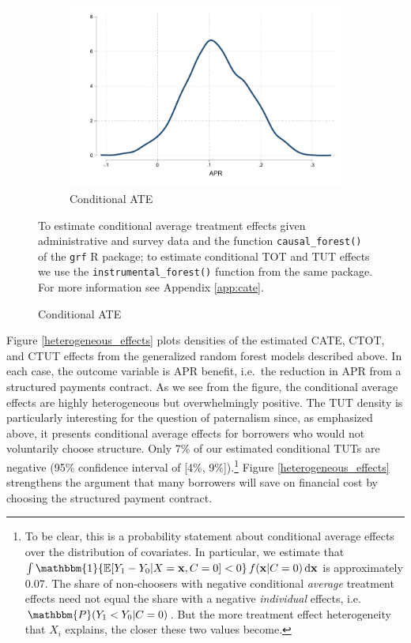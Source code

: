 \documentclass[12pt, a4paper, colorinlistoftodos]{article}
\begin{document}
\begin{figure}[!h]
\begin{center}
\begin{subfigure}{.35\textwidth}
        \includegraphics[width=\textwidth]{Figuras/he_dist_tau_hat_eff.pdf}
        \caption{Conditional ATE}
    \end{subfigure} 
    \end{center}
  \scriptsize{To estimate conditional average treatment effects given administrative and survey data and the function \texttt{causal\_forest()} of the \texttt{grf} R package; to estimate conditional TOT and TUT effects we use the \texttt{instrumental\_forest()} function from the same package. For more information see Appendix \ref{app:cate}.} 
\end{figure}


Figure \ref{heterogeneous_effects} plots densities of the estimated CATE, CTOT, and CTUT effects from the generalized random forest models described above.
In each case, the outcome variable is APR benefit, i.e.\ the reduction in APR from a structured payments contract.
As we see from the figure, the conditional average effects are highly heterogeneous but overwhelmingly positive. 
The TUT density is particularly interesting for the question of paternalism since, as emphasized above, it presents conditional average effects for borrowers who would not voluntarily choose structure.
Only 7\% of our estimated conditional TUTs are negative (95\% confidence interval of [4\%, 9\%]).\footnote{To be clear, this is a probability statement about conditional average effects over the distribution of covariates.
In particular, we estimate that  $\int \mathbbm{1}\{\mathbb{E}[Y_1 - Y_0| X = \mathbf{x}, C = 0] < 0\} \, f(\mathbf{x}|C=0) \, \mathrm{d}\mathbf{x}$ is approximately 0.07. The share of non-choosers with negative conditional \emph{average} treatment effects need not equal the share with a negative \emph{individual} effects, i.e.\ $\mathbbm{P}(Y_1 < Y_0| C = 0)$.
But the more treatment effect heterogeneity that $X_i$ explains, the closer these two values become.}
Figure \ref{heterogeneous_effects} strengthens the argument that many borrowers will save on financial cost by choosing the structured payment contract.
\end{document}
